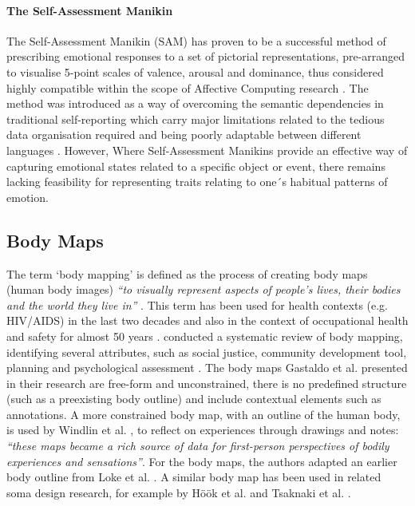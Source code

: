 \paragraph{The Self-Assessment Manikin}

The Self-Assessment Manikin (SAM) has proven to be a successful method of prescribing emotional responses to a set of pictorial representations, pre-arranged to visualise 5-point scales of valence, arousal and dominance, thus considered highly compatible within the scope of Affective Computing research \cite{broekens_affectbutton_2013,zeigler-hill_self-assessment_2017}. The method was introduced as a way of overcoming the semantic dependencies in traditional self-reporting which carry major limitations related to the tedious data organisation required and being poorly adaptable between different languages \cite{zeigler-hill_self-assessment_2017}. However, Where Self-Assessment Manikins provide an effective way of capturing emotional states related to a specific object or event, there remains lacking feasibility for representing traits relating to one´s habitual patterns of emotion.

\subsection{Body Maps}

The term ‘body mapping’ is defined as the process of creating body maps (human body images) \textit{``to visually represent aspects of people's lives, their bodies and the world they live in''} \cite{gastaldo_body-map_2012}. This term has been used for health contexts (e.g. HIV/AIDS) in the last two decades and also in the context of occupational health and safety for almost 50 years \cite{gastaldo_body-map_2012}. \citeauthor{de_jager_embodied_2016} conducted a systematic review of body mapping, identifying several attributes, such as social justice, community development tool, planning and psychological assessment \cite{de_jager_embodied_2016}. The body maps Gastaldo et al. presented in their research are free-form and unconstrained, there is no predefined structure (such as a preexisting body outline) and include contextual elements such as annotations. A more constrained body map, with an outline of the human body, is used by Windlin et al. \cite{windlin_soma_2019}, to reflect on experiences through drawings and notes: \textit{“these maps became a rich source of data for first-person perspectives of bodily experiences and sensations”}. For the body maps, the authors adapted an earlier body outline from Loke et al. \cite{loke_bodily_2012}. A similar body map has been used in related soma design research, for example by Höök et al. \cite{hook_soma_2019} and Tsaknaki et al. \cite{tsaknaki_teaching_2019}.

